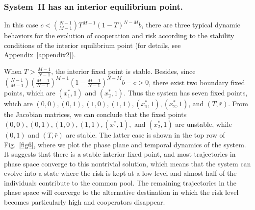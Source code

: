 \documentclass[9pt]{elife}
\begin{document}
\subsubsection{System~II has an interior equilibrium point.}

In this case $c<\binom{N-1}{M-1}T^{M-1}(1-T)^{N-M}b$, there are three typical dynamic behaviors for the evolution of cooperation and risk according to the stability conditions of the interior equilibrium point (for details, see Appendix~\ref{appendix2}).

When $T>\frac{M-1}{N-1}$, the interior fixed point is stable. Besides, since $\binom{N-1}{M-1}(\frac{M-1}{N-1})^{M-1}(1-\frac{M-1}{N-1})^{N-M}b-c>0$, there exist two boundary fixed points, which are $(x_{1}^{*}, 1)$ and $(x_{2}^{*}, 1)$. Thus the system has seven fixed points, which are $(0, 0), (0, 1), (1, 0), (1, 1),(x_{1}^{*}, 1), (x_{2}^{*}, 1)$, and $(T,\bar{r})$. From the Jacobian matrices, we can conclude that the fixed points $(0, 0), (0, 1), (1, 0), (1, 1),(x_{1}^{*}, 1),$ and $(x_{2}^{*}, 1)$ are unstable, while $(0, 1)$ and $(T, \bar{r})$ are stable. The latter case is shown in the top row of Fig.~\ref{fig6}, where we plot the phase plane and temporal dynamics of the system. It suggests that there is a stable interior fixed point, and most trajectories in phase space converge to this nontrivial solution, which means that the system can evolve into a state where the risk is kept at a low level and almost half of the individuals contribute to the common pool. The remaining trajectories in the phase space will converge to the alternative destination in which the risk level becomes particularly high and cooperators disappear.
\end{document}
